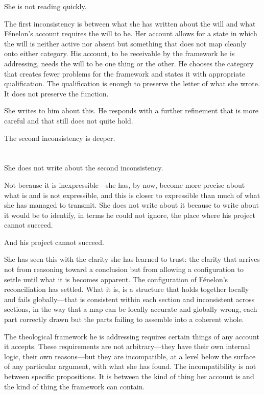 She is not reading quickly.

The first inconsistency is between what she has written
about the will and what Fénelon's account requires the
will to be. Her account allows for a state in which the
will is neither active nor absent but something that
does not map cleanly onto either category. His account,
to be receivable by the framework he is addressing,
needs the will to be one thing or the other. He chooses
the category that creates fewer problems for the
framework and states it with appropriate qualification.
The qualification is enough to preserve the letter of
what she wrote. It does not preserve the function.

She writes to him about this. He responds with a further
refinement that is more careful and that still does not
quite hold.

The second inconsistency is deeper.

\section{}

She does not write about the second inconsistency.

Not because it is inexpressible---she has, by now, become
more precise about what is and is not expressible, and this
is closer to expressible than much of what she has managed
to transmit. She does not write about it because to write
about it would be to identify, in terms he could not ignore,
the place where his project cannot succeed.

And his project cannot succeed.

She has seen this with the clarity she has learned to trust:
the clarity that arrives not from reasoning toward a
conclusion but from allowing a configuration to settle until
what it is becomes apparent. The configuration of Fénelon's
reconciliation has settled. What it is, is a structure that
holds together locally and fails globally---that is consistent
within each section and inconsistent across sections, in the
way that a map can be locally accurate and globally wrong,
each part correctly drawn but the parts failing to assemble
into a coherent whole.

The theological framework he is addressing requires
certain things of any account it accepts. These requirements
are not arbitrary---they have their own internal logic,
their own reasons---but they are incompatible, at a level
below the surface of any particular argument, with what
she has found. The incompatibility is not between specific
propositions. It is between the kind of thing her
account is and the kind of thing the framework can contain.

